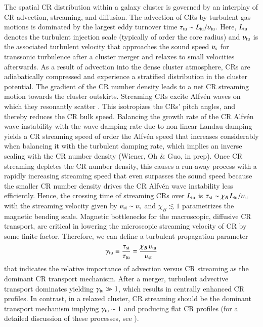\documentclass[useAMS,usenatbib]{mn2e}
\newcommand{\vel}{\upsilon}
\begin{document}
The spatial CR distribution within a galaxy cluster is governed by an interplay
of CR advection, streaming, and diffusion. The advection of CRs by turbulent gas
motions is dominated by the largest eddy turnover time $\tau_{\rmn{tu}}\sim
L_{\rmn{tu}}/ \vel_{\rmn{tu}}$. Here, $L_{{\mathrm{tu}}}$ denotes the turbulent
injection scale (typically of order the core radius) and $\vel_{\rmn{tu}}$ is
the associated turbulent velocity that approaches the sound speed
$\vel_{\rmn{s}}$ for transsonic turbulence after a cluster merger and relaxes to
small velocities afterwards. As a result of advection into the dense cluster
atmosphere, CRs are adiabatically compressed and experience a stratified
distribution in the cluster potential. The gradient of the CR number density
leads to a net CR streaming motion towards the cluster outskirts. Streaming CRs
excite Alfv{\'e}n waves on which they resonantly scatter
\citep{1969ApJ...156..445K}. This isotropizes the CRs' pitch angles, and thereby
reduces the CR bulk speed. Balancing the growth rate of the CR Alfv{\'e}n wave
instability with the wave damping rate due to non-linear Landau damping yields a
CR streaming speed of order the Alfv{\'e}n speed \citep{2001ApJ...553..198F}
that increases considerably when balancing it with the turbulent damping rate,
which implies an inverse scaling with the CR number density (Wiener, Oh \& Guo,
in prep). Once CR streaming depletes the CR number density, this causes a
run-away process with a rapidly increasing streaming speed that even surpasses
the sound speed because the smaller CR number density drives the CR Alfv{\'e}n
wave instability less efficiently. Hence, the crossing time of streaming CRs
over $L_{{\mathrm{tu}}}$ is $\tau_{\rmn{st}}\sim \chi_B\,L_{\rmn{tu}}/
\vel_{\rmn{st}}$ with the streaming velocity given by $\vel_{\rmn{st}}\sim
\vel_{\rmn{s}}$ and $\chi_B\lesssim 1$ parametrizes the magnetic bending scale.
Magnetic bottlenecks for the macroscopic, diffusive CR transport, are critical
in lowering the microscopic streaming velocity of CR by some finite
factor. Therefore, we can define a turbulent propagation parameter
\begin{equation}
  \label{eq:gamma_tu}
  \gamma_{\rmn{tu}}\equiv\frac{\tau_{\rmn{st}}}{\tau_{\rmn{tu}}}=
  \frac{\chi_B\,\vel_{\rmn{tu}}}{\vel_{\rmn{st}}}
\end{equation}
that indicates the relative importance of advection versus CR streaming as the
dominant CR transport mechanism. After a merger, turbulent advective transport
dominates yielding $\gamma_{{\mathrm{tu}}}\gg 1$, which results in centrally enhanced
CR profiles. In contrast, in a relaxed cluster, CR streaming should be the
dominant transport mechanism implying $\gamma_{{\mathrm{tu}}}\sim1$ and producing
flat CR profiles (for a detailed discussion of these processes, see
\citealp{2011A&A...527A..99E}).
\end{document}
